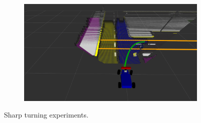 \begin{figure}[h]
\begin{subfigure}[b]{0.45\linewidth}
  \end{subfigure}
  \begin{subfigure}[b]{0.45\linewidth}
    \includegraphics[width=\linewidth]{figures/experiments/parking-pc.png}
  \end{subfigure}
  \caption{Sharp turning experiments.}
  \label{figure:sharp-turns}
\end{figure}

